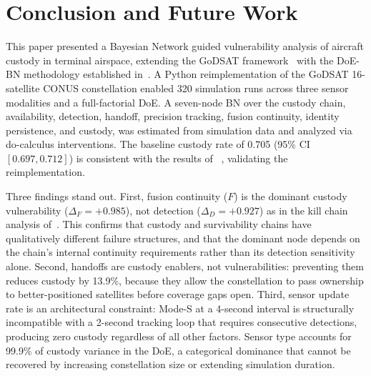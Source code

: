 \documentclass[]{spie}
\begin{document}
\section{Conclusion and Future Work}
\label{sec:conclusion}

This paper presented a Bayesian Network guided vulnerability analysis of aircraft custody in terminal airspace, extending the GoDSAT framework~\cite{Saeed2026GoDSATRL} with the DoE-BN methodology established in~\cite{Saeed2025DOEFramework,Saeed2025BNDOE}. A Python reimplementation of the GoDSAT 16-satellite CONUS constellation enabled 320 simulation runs across three sensor modalities and a full-factorial DoE. A seven-node BN over the custody chain, availability, detection, handoff, precision tracking, fusion continuity, identity persistence, and custody, was estimated from simulation data and analyzed via do-calculus interventions. The baseline custody rate of 0.705 (95\% CI $[0.697, 0.712]$) is consistent with the results of ~\cite{Saeed2026GoDSATRL}, validating the reimplementation.

Three findings stand out. First, fusion continuity ($F$) is the dominant custody vulnerability ($\Delta_F = +0.985$), not detection ($\Delta_D = +0.927$) as in the kill chain analysis of~\cite{Saeed2025DOEFramework}. This confirms that custody and survivability chains have qualitatively different failure structures, and that the dominant node depends on the chain's internal continuity requirements rather than its detection sensitivity alone. Second, handoffs are custody enablers, not vulnerabilities: preventing them reduces custody by 13.9\%, because they allow the constellation to pass ownership to better-positioned satellites before coverage gaps open. Third, sensor update rate is an architectural constraint: Mode-S at a 4-second interval is structurally incompatible with a 2-second tracking loop that requires consecutive detections, producing zero custody regardless of all other factors. Sensor type accounts for 99.9\% of custody variance in the DoE, a categorical dominance that cannot be recovered by increasing constellation size or extending simulation duration.
\end{document}
